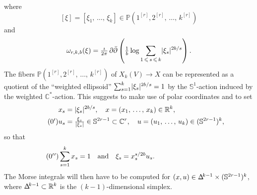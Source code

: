 \documentclass[AHL,Unicode,longabstracts,published]{cedram}
\DeclareMathOperator{\ddbar}{\partial\bar\partial}
\DeclarePairedDelimiter{\abs}{\lvert}{\rvert}
\newcommand*\bC{\mathbb{C}}
\newcommand*\bP{\mathbb{P}}
\newcommand*\bR{\mathbb{R}}
\newcommand*\bS{\mathbb{S}}
\newcommand\bDel{\mbox{$\Delta$\newline \scalebox{.6}{\raisebox{3pt}{$\mkern-22mu\not{}\mkern12mu$}}}}
\newcommand\bDelta{\mathchoice{\bDel}{\bDel}{\scalebox{.7}{\bDel}}{\scalebox{.5}{\bDel}}}
\let\leq\leqslant
\begin{document}
where
\[
[\xi] = [\xi_1,\,\dotsc,\,\xi_k]\in\bP\left(1^{[r]},2^{[r]},\,\dotsc,\,k^{[r]}\right)
\]
and
\[
\omega_{r,k,b}(\xi) =
\tfrac{\imath}{ 2\pi}\ddbar\left(\tfrac{1}{ b}\log\sum_{1\,\leq \,s\,\leq\,k} \abs{\xi_s}^{2b/s}\right).
\]
The fibers $\bP(1^{[r]},2^{[r]},\,\dotsc,\,k^{[r]})$ of
$X_k(V)\to X$ can be represented as a quotient of the ``weighted ellipsoid'' $\sum_{s=1}^k\abs{\xi_s}^{2b/s}=1$ by the $\bS^1$-action induced by the weighted $\bC^*$-action. This suggests to make use of polar coordinates and to set
\begin{align}\label{eq:coordinates}
x_s&=\abs{\xi_s}^{2b/s},\quad x=(x_1,\,\dotsc,\,x_k)\in\bR^k,
\\
\tag{\theequation\ensuremath{'}} u_s&=\tfrac{\xi_s}{ \abs{\xi_s}}\in \bS^{2r-1}\subset\bC^r,\quad u=(u_1,\,\dotsc,\,u_k)\in(\bS^{2r-1})^k,
\end{align}
so that
\[
\tag{\theequation\ensuremath{'}\ensuremath{'}}
\sum_{s=1}^kx_s=1\quad\text{and}\quad \xi_s=x_s^{s/2b}u_s.\kern102pt
\]
The Morse integrals will then have to be computed for
$(x,u)\in\bDelta^{k-1}\times(\bS^{2r-1})^k$, where
$\bDelta^{k-1}\subset\bR^k$ is the $(k-1)$-dimensional simplex.
\end{document}
